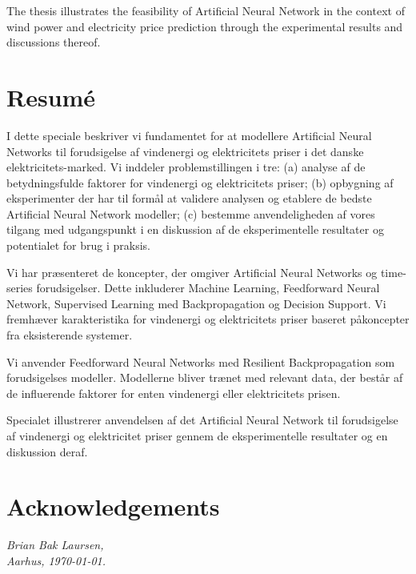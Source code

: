 \documentclass[twoside,11pt,openright]{report}
\begin{document}
The thesis illustrates the feasibility of Artificial Neural Network in the context of wind power and electricity price prediction through the experimental results and discussions thereof.

\chapter*{Resum\'e}

I dette speciale beskriver vi fundamentet for at modellere Artificial Neural Networks til forudsigelse af vindenergi og elektricitets priser i det danske elektricitets-marked. Vi inddeler problemstillingen i tre: (a) analyse af de betydningsfulde faktorer for vindenergi og elektricitets priser; (b) opbygning af eksperimenter der har til form\aa l at validere analysen og etablere de bedste Artificial Neural Network modeller; (c) bestemme anvendeligheden af vores tilgang med udgangspunkt i en diskussion af de eksperimentelle resultater og potentialet for brug i praksis.

Vi har pr\ae senteret de koncepter, der omgiver Artificial Neural Networks og time-series forudsigelser. Dette inkluderer Machine Learning, Feedforward Neural Network, Supervised Learning med Backpropagation og Decision Support. Vi fremh\ae ver karakteristika for vindenergi og elektricitets priser baseret p\aa  koncepter fra eksisterende systemer.

Vi anvender Feedforward Neural Networks med Resilient Backpropagation som forudsigelses modeller. Modellerne bliver tr\ae net med relevant data, der best\aa r af de influerende faktorer for enten vindenergi eller elektricitets prisen.

Specialet illustrerer anvendelsen af det Artificial Neural Network til forudsigelse af vindenergi og elektricitet priser gennem de eksperimentelle resultater og en diskussion deraf. 

\chapter*{Acknowledgements}

\todo{\dots}

\vspace{2ex}
\begin{flushright}
  \emph{Brian Bak Laursen,}\\
  \emph{Aarhus, \today.}
\end{flushright}
\end{document}

